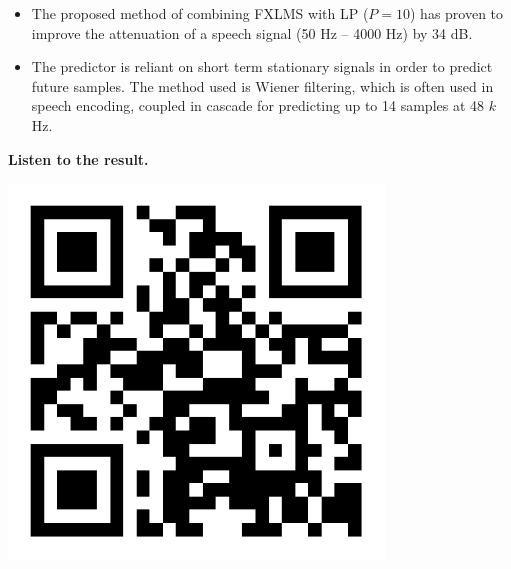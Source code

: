 \large
\begin{itemize}
	\item The proposed method of combining FXLMS with LP ($P=10$) has proven to improve the attenuation of a speech signal (50 Hz -- 4000 Hz) by 34 dB.
	\item The predictor is reliant on short term stationary signals in order to predict future samples. The method used is Wiener filtering, which is often used in speech encoding, coupled in cascade for predicting up to 14 samples at 48 $k$Hz.
\end{itemize}

 \begin{minipage}{.8\columnwidth}
 	\textbf{Listen to the result.}
 \end{minipage}%
 \begin{minipage}{0.2\columnwidth}
 	\includegraphics[width=0.75\textwidth]{figures/QRCODE.pdf}
 \end{minipage}